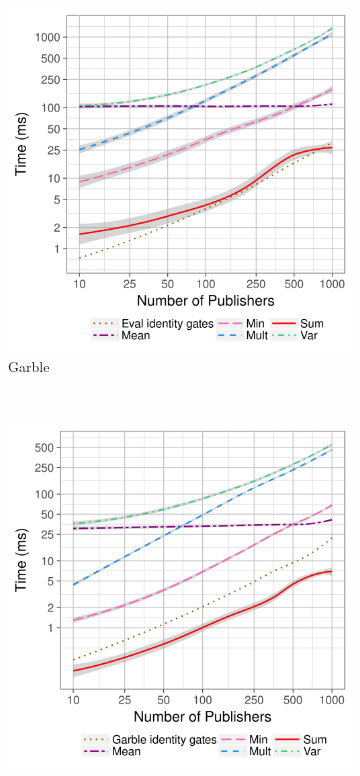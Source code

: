 \begin{figure}[ht]
    \centering
    \begin{subfigure}[b]{0.32\textwidth}
        \includegraphics[width=\textwidth]{plots/garble_loglog.png}
        \caption{Garble}
        \label{fig:micro-garble-time}
    \end{subfigure}
    ~ %
    \begin{subfigure}[b]{0.32\textwidth}
        \includegraphics[width=\textwidth]{plots/eval_loglog.png}

\end{subfigure}
\end{figure}
